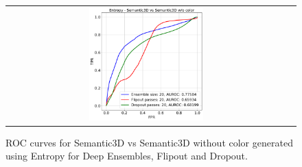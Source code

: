 \begin{figure}
\begin{tabular}{cc}
            \includegraphics[width = 0.42\textwidth, height= 0.3\textheight]{images/AUROC/Entropy_cnc_20.pdf} &
            \\
        \end{tabular}
        \caption{ROC curves for Semantic3D vs Semantic3D without color generated using Entropy for Deep Ensembles, Flipout and Dropout.}
        \label{fig:roc_ent_ood_2}
    \end{figure}

